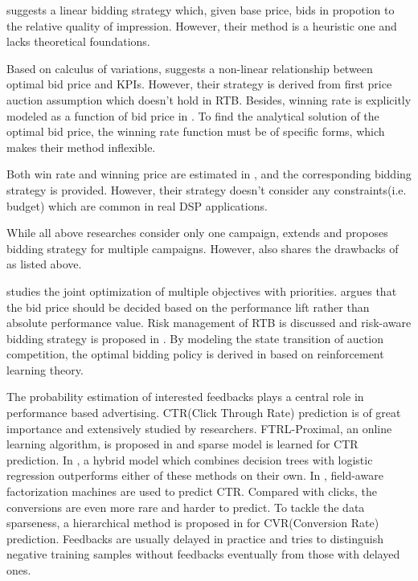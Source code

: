 \documentclass[sigconf]{acmart}
\begin{document}
\cite{M6D} suggests a linear bidding strategy which, given base price,
    bids in propotion to the relative quality of impression.
However, their method is a heuristic one and lacks theoretical foundations.

Based on calculus of variations, \cite{WeinanZhang2014} suggests a non-linear relationship between optimal bid price and KPIs.
However, their strategy is derived from first price auction assumption which doesn't hold in RTB.
Besides, winning rate is explicitly modeled as a function of bid price in \cite{WeinanZhang2014}.
To find the analytical solution of the optimal bid price,
    the winning rate function must be of specific forms,
    which makes their method inflexible.

Both win rate and winning price are estimated in \cite{XiangLi2014}, and the corresponding bidding strategy is provided.
However, their strategy doesn't consider any constraints(i.e. budget) which are common in real DSP applications.

While all above researches consider only one campaign,
    \cite{WeinanZhang2015} extends \cite{WeinanZhang2014} and proposes bidding strategy for multiple campaigns.
However, \cite{WeinanZhang2015} also shares the drawbacks of \cite{WeinanZhang2014} as listed above.

\cite{Joint2016} studies the joint optimization of multiple objectives with priorities.
\cite{Lift2016} argues that the bid price should be decided
    based on the performance lift rather than absolute performance value.
Risk management of RTB is discussed and risk-aware bidding strategy is proposed in \cite{Risk2017}.
By modeling the state transition of auction competition,
    the optimal bidding policy is derived in \cite{Reinforce2017} based on reinforcement learning theory.

The probability estimation of interested feedbacks plays a central role in performance based advertising.
CTR(Click Through Rate) prediction is of great importance and extensively studied by researchers.
FTRL-Proximal, an online learning algorithm, is proposed in \cite{Google2013} and sparse model is learned for CTR prediction.
In \cite{Facebook2014}, a hybrid model which combines decision trees with logistic regression
    outperforms either of these methods on their own.
In \cite{FFM2016}, field-aware factorization machines are used to predict CTR.
Compared with clicks, the conversions are even more rare and harder to predict.
To tackle the data sparseness, a hierarchical method is proposed in \cite{CVR} for CVR(Conversion Rate) prediction.
Feedbacks are usually delayed in practice and \cite{DelayedFeedback} tries to
    distinguish negative training samples without feedbacks eventually from those with delayed ones.
\end{document}
